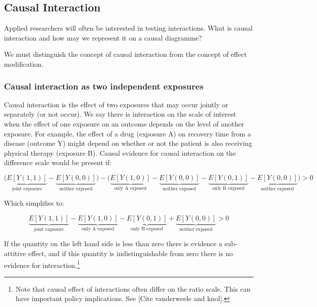 \documentclass[
  singlecolumn]{report}
\begin{document}
\hypertarget{causal-interaction}{%
\subsection{Causal Interaction}\label{causal-interaction}}

Applied researchers will often be interested in testing interactions.
What is causal interaction and how may we represent it on a causal
diagramme?

We must distinguish the concept of causal interaction from the concept
of effect modification.

\hypertarget{causal-interaction-as-two-independent-exposures}{%
\subsubsection{\texorpdfstring{\textbf{Causal interaction as two
independent
exposures}}{Causal interaction as two independent exposures}}\label{causal-interaction-as-two-independent-exposures}}

Causal interaction is the effect of two exposures that may occur jointly
or separately (or not occur). We say there is interaction on the scale
of interest when the effect of one exposure on an outcome depends on the
level of another exposure. For example, the effect of a drug (exposure
A) on recovery time from a disease (outcome Y) might depend on whether
or not the patient is also receiving physical therapy (exposure B).
Causal evidence for causal interaction on the difference scale would be
present if:

\[\bigg(\underbrace{E[Y(1,1)]}_{\text{joint exposure}} - \underbrace{E[Y(0,0)]}_{\text{neither exposed}}\bigg) - \bigg(\underbrace{E[Y(1,0)]}_{\text{only A exposed}} - \underbrace{E[Y(0,0)]}_{\text{neither exposed}}- \underbrace{E[Y(0,1)]}_{\text{only B exposed}} - \underbrace{E[Y(0,0)]}_{\text{neither exposed}} \bigg) > 0 \]

Which simplifies to:

\[ \underbrace{E[Y(1,1)]}_{\text{joint exposure}} - \underbrace{E[Y(1,0)]}_{\text{only A exposed}} - \underbrace{E[Y(0,1)]}_{\text{only B exposed}} + \underbrace{E[Y(0,0)]}_{\text{neither exposed}} > 0 \]

If the quantity on the left hand side is less than zero there is
evidence a sub-attitive effect, and if this quantity is
indistinguishable from zero there is no evidence for
interaction.\footnote{Note that causal effect of interactions often
  differ on the ratio scale. This can have important policy
  implications. See {[}Cite vanderweele and knol{]}.}
\end{document}
